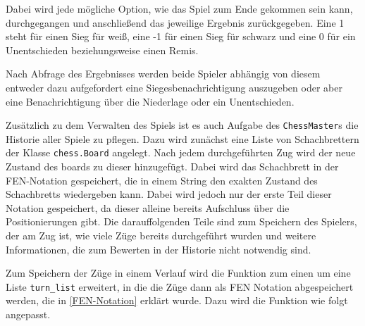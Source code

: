     Dabei wird jede mögliche Option, wie das Spiel zum Ende gekommen sein
kann, durchgegangen und anschließend das jeweilige Ergebnis
zurückgegeben. Eine 1 steht für einen Sieg für weiß, eine -1 für einen
Sieg für schwarz und eine 0 für ein Unentschieden beziehungsweise einen
Remis.

Nach Abfrage des Ergebnisses werden beide Spieler abhängig von diesem
entweder dazu aufgefordert eine Siegesbenachrichtigung auszugeben oder
aber eine Benachrichtigung über die Niederlage oder ein Unentschieden.

Zusätzlich zu dem Verwalten des Spiels ist es auch Aufgabe des
\texttt{ChessMaster}s die Historie aller Spiele zu pflegen. Dazu wird
zunächst eine Liste von Schachbrettern der Klasse \texttt{chess.Board}
angelegt. Nach jedem durchgeführten Zug wird der neue Zustand des boards
zu dieser hinzugefügt. Dabei wird das Schachbrett in der FEN-Notation
gespeichert, die in einem String den exakten Zustand des Schachbretts
wiedergeben kann. Dabei wird jedoch nur der erste Teil dieser Notation
gespeichert, da dieser alleine bereits Aufschluss über die
Positionierungen gibt. Die darauffolgenden Teile sind zum Speichern des
Spielers, der am Zug ist, wie viele Züge bereits durchgeführt wurden und
weitere Informationen, die zum Bewerten in der Historie nicht notwendig
sind.

Zum Speichern der Züge in einem Verlauf wird die Funktion zum einen um
eine Liste \texttt{turn\_list} erweitert, in die die Züge dann als
FEN Notation abgespeichert werden, die in \ref{FEN-Notation} erklärt wurde. Dazu wird die Funktion wie
folgt angepasst.


